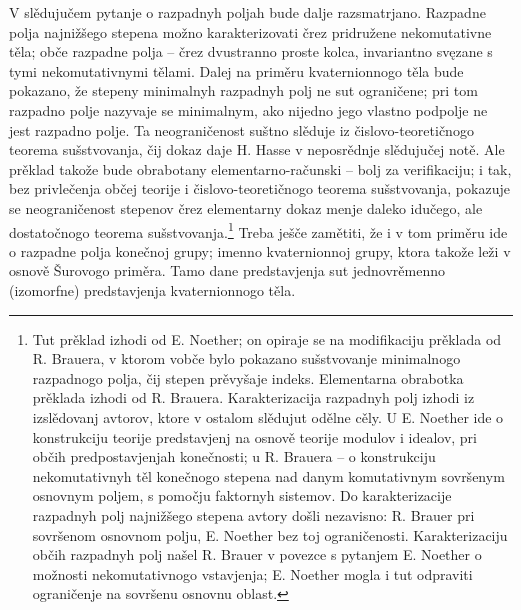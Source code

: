\documentclass[11pt]{article}
\begin{document}
\setcounter{footnote}{0}

\noindent V slědujučem pytanje o razpadnyh poljah bude dalje razsmatrjano. Razpadne polja najnižšego stepena možno karakterizovati črez pridružene nekomutativne těla; obče razpadne polja -- črez dvustranno proste kolca, invariantno svęzane s tymi nekomutativnymi tělami. Dalej na priměru kvaternionnogo těla bude pokazano, že stepeny minimalnyh razpadnyh polj ne sut ograničene; pri tom razpadno polje nazyvaje se minimalnym, ako nijedno jego vlastno podpolje ne jest razpadno polje. Ta neograničenost suštno slěduje iz čislovo-teoretičnogo teorema sušstvovanja, čij dokaz daje H. Hasse v neposrědnje slědujučej notě. Ale prěklad takože bude obrabotany elementarno-računski -- bolj za verifikaciju; i tak, bez privlečenja občej teorije i čislovo-teoretičnogo teorema sušstvovanja, pokazuje se neograničenost stepenov črez elementarny dokaz menje daleko idučego, ale dostatočnogo teorema sušstvovanja.\footnote{Tut prěklad izhodi od E. Noether; on opiraje se na modifikaciju prěklada od R. Brauera, v ktorom vobče bylo pokazano sušstvovanje minimalnogo razpadnogo polja, čij stepen prěvyšaje indeks. Elementarna obrabotka prěklada izhodi od R. Brauera. Karakterizacija razpadnyh polj izhodi iz izslědovanj avtorov, ktore v ostalom slědujut odělne cěly. U E. Noether ide o konstrukciju teorije predstavjenj na osnově teorije modulov i idealov, pri občih predpostavjenjah konečnosti; u R. Brauera -- o konstrukciju nekomutativnyh těl konečnogo stepena nad danym komutativnym sovršenym osnovnym poljem, s pomočju faktornyh sistemov. Do karakterizacije razpadnyh polj najnižšego stepena avtory došli nezavisno: R. Brauer pri sovršenom osnovnom polju, E. Noether bez toj ograničenosti. Karakterizaciju občih razpadnyh polj našel R. Brauer v povezce s pytanjem E. Noether o možnosti nekomutativnogo vstavjenja; E. Noether mogla i tut odpraviti ograničenje na sovršenu osnovnu oblast.} Treba ješče zamětiti, že i v tom priměru ide o razpadne polja konečnoj grupy; imenno kvaternionnoj grupy, ktora takože leži v osnově Šurovogo priměra. Tamo dane predstavjenja sut jednovrěmenno (izomorfne) predstavjenja kvaternionnogo těla.
\end{document}

